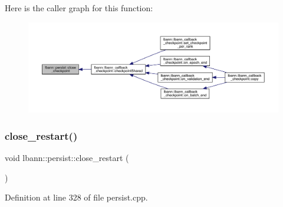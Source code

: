 Here is the caller graph for this function\+:\nopagebreak
\begin{figure}[H]
\begin{center}
\leavevmode
\includegraphics[width=350pt]{classlbann_1_1persist_ab099939d0d91101fbfaf2b85e78be032_icgraph}
\end{center}
\end{figure}
\mbox{\label{classlbann_1_1persist_afeef05548e1d17bd09d3805607edd621}} 
\subsubsection{\texorpdfstring{close\+\_\+restart()}{close\_restart()}}
{\footnotesize\ttfamily void lbann\+::persist\+::close\+\_\+restart (\begin{DoxyParamCaption}{ }\end{DoxyParamCaption})}



Definition at line 328 of file persist.\+cpp.



